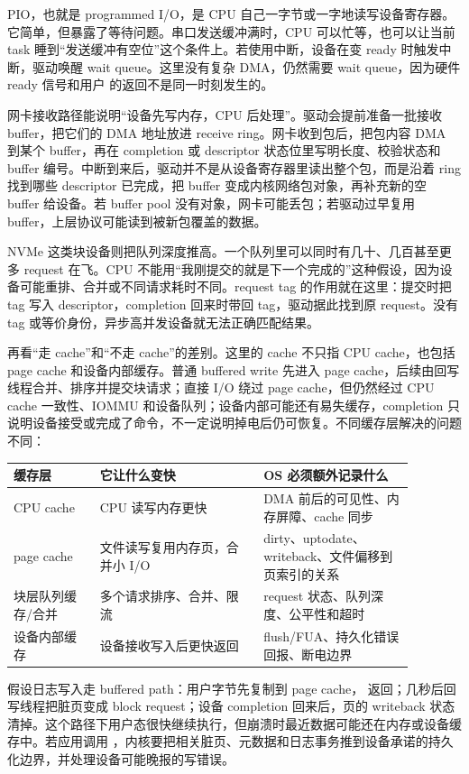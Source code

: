 PIO，也就是 programmed I/O，是 CPU 自己一字节或一字地读写设备寄存器。它简单，但暴露了等待问题。串口发送缓冲满时，CPU 可以忙等，也可以让当前 task 睡到“发送缓冲有空位”这个条件上。若使用中断，设备在变 ready 时触发中断，驱动唤醒 wait queue。这里没有复杂 DMA，仍然需要 wait queue，因为硬件 ready 信号和用户  的返回不是同一时刻发生的。

网卡接收路径能说明“设备先写内存，CPU 后处理”。驱动会提前准备一批接收 buffer，把它们的 DMA 地址放进 receive ring。网卡收到包后，把包内容 DMA 到某个 buffer，再在 completion 或 descriptor 状态位里写明长度、校验状态和 buffer 编号。中断到来后，驱动并不是从设备寄存器里读出整个包，而是沿着 ring 找到哪些 descriptor 已完成，把 buffer 变成内核网络包对象，再补充新的空 buffer 给设备。若 buffer pool 没有对象，网卡可能丢包；若驱动过早复用 buffer，上层协议可能读到被新包覆盖的数据。

NVMe 这类块设备则把队列深度推高。一个队列里可以同时有几十、几百甚至更多 request 在飞。CPU 不能用“我刚提交的就是下一个完成的”这种假设，因为设备可能重排、合并或不同请求耗时不同。request tag 的作用就在这里：提交时把 tag 写入 descriptor，completion 回来时带回 tag，驱动据此找到原 request。没有 tag 或等价身份，异步高并发设备就无法正确匹配结果。

再看“走 cache”和“不走 cache”的差别。这里的 cache 不只指 CPU cache，也包括 page cache 和设备内部缓存。普通 buffered write 先进入 page cache，后续由回写线程合并、排序并提交块请求；直接 I/O 绕过 page cache，但仍然经过 CPU cache 一致性、IOMMU 和设备队列；设备内部可能还有易失缓存，completion 只说明设备接受或完成了命令，不一定说明掉电后仍可恢复。不同缓存层解决的问题不同：

\begin{longtable}{p{0.19\linewidth}p{0.36\linewidth}p{0.33\linewidth}}
\toprule
缓存层 & 它让什么变快 & OS 必须额外记录什么 \\
\midrule
CPU cache & CPU 读写内存更快 & DMA 前后的可见性、内存屏障、cache 同步 \\
page cache & 文件读写复用内存页，合并小 I/O & dirty、uptodate、writeback、文件偏移到页索引的关系 \\
块层队列缓存/合并 & 多个请求排序、合并、限流 & request 状态、队列深度、公平性和超时 \\
设备内部缓存 & 设备接收写入后更快返回 & flush/FUA、持久化错误回报、断电边界 \\
\bottomrule
\end{longtable}

假设日志写入走 buffered path：用户字节先复制到 page cache， 返回；几秒后回写线程把脏页变成 block request；设备 completion 回来后，页的 writeback 状态清掉。这个路径下用户态很快继续执行，但崩溃时最近数据可能还在内存或设备缓存中。若应用调用 ，内核要把相关脏页、元数据和日志事务推到设备承诺的持久化边界，并处理设备可能晚报的写错误。

